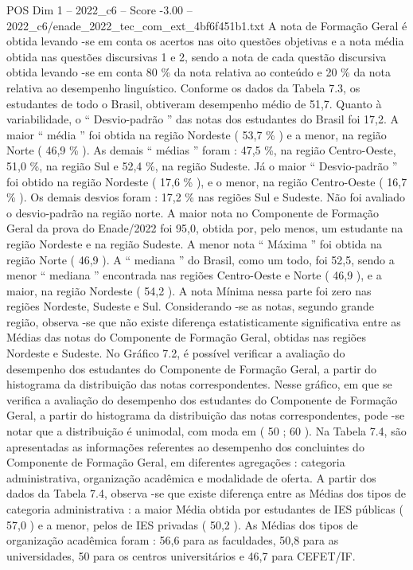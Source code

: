 \begin{textsample}{POS Dim 1 – 2022\_c6 – Score -3.00 – 2022\_c6/enade\_2022\_tec\_com\_ext\_4bf6f451b1.txt}
A nota de Formação Geral é obtida levando -se em conta os acertos nas oito questões objetivas e a nota média obtida nas questões discursivas 1 e 2, sendo a nota de cada questão discursiva obtida levando -se em conta 80 \% da nota relativa ao conteúdo e 20 \% da nota relativa ao desempenho linguístico.
Conforme os dados da Tabela 7.3, os estudantes de todo o Brasil, obtiveram desempenho médio de 51,7.
Quanto à variabilidade, o “ Desvio-padrão ” das notas dos estudantes do Brasil foi 17,2.
A maior “ média ” foi obtida na região Nordeste ( 53,7 \% ) e a menor, na região Norte ( 46,9 \% ).
As demais “ médias ” foram : 47,5 \%, na região Centro-Oeste, 51,0 \%, na região Sul e 52,4 \%, na região Sudeste.
Já o maior “ Desvio-padrão ” foi obtido na região Nordeste ( 17,6 \% ), e o menor, na região Centro-Oeste ( 16,7 \% ).
Os demais desvios foram : 17,2 \% nas regiões Sul e Sudeste.
Não foi avaliado o desvio-padrão na região norte.
A maior nota no Componente de Formação Geral da prova do Enade/2022 foi 95,0, obtida por, pelo menos, um estudante na região Nordeste e na região Sudeste.
A menor nota “ Máxima ” foi obtida na região Norte ( 46,9 ).
A “ mediana ” do Brasil, como um todo, foi 52,5, sendo a menor “ mediana ” encontrada nas regiões Centro-Oeste e Norte ( 46,9 ), e a maior, na região Nordeste ( 54,2 ).
A nota Mínima nessa parte foi zero nas regiões Nordeste, Sudeste e Sul.
Considerando -se as notas, segundo grande região, observa -se que não existe diferença estatisticamente significativa entre as Médias das notas do Componente de Formação Geral, obtidas nas regiões Nordeste e Sudeste.
No Gráfico 7.2, é possível verificar a avaliação do desempenho dos estudantes do Componente de Formação Geral, a partir do histograma da distribuição das notas correspondentes.
Nesse gráfico, em que se verifica a avaliação do desempenho dos estudantes do Componente de Formação Geral, a partir do histograma da distribuição das notas correspondentes, pode -se notar que a distribuição é unimodal, com moda em ( 50 ; 60 ).
Na Tabela 7.4, são apresentadas as informações referentes ao desempenho dos concluintes do Componente de Formação Geral, em diferentes agregações : categoria administrativa, organização acadêmica e modalidade de oferta.
A partir dos dados da Tabela 7.4, observa -se que existe diferença entre as Médias dos tipos de categoria administrativa : a maior Média obtida por estudantes de IES públicas ( 57,0 ) e a menor, pelos de IES privadas ( 50,2 ).
As Médias dos tipos de organização acadêmica foram : 56,6 para as faculdades, 50,8 para as universidades, 50 para os centros universitários e 46,7 para CEFET/IF.

\end{textsample}
